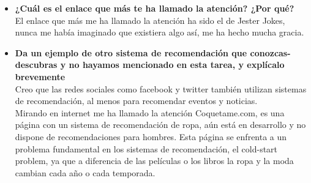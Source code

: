 \documentclass[es]{ifirak}
\begin{document}
\begin{itemize}
	\item \textbf{	¿Cuál es el enlace que más te ha llamado la atención? ¿Por qué?}\\
	El enlace que más me ha llamado la atención ha sido el de Jester Jokes, nunca me había imaginado que existiera algo así, me ha hecho mucha gracia.
	\item \textbf{ Da un ejemplo de otro sistema de recomendación que conozcas-descubras y no hayamos mencionado en esta tarea, y explícalo brevemente}\\
	Creo que las redes sociales como facebook y twitter también utilizan sistemas de recomendación, al menos para recomendar eventos y noticias.\\
	Mirando en internet me ha llamado la atención Coquetame.com, es una página con un sistema de recomendación de ropa, aún está en desarrollo y no dispone de recomendaciones para hombres. Esta página se enfrenta a un problema fundamental en los sistemas de recomendación, el cold-start problem, ya que a diferencia de las películas o los libros la ropa y la moda cambian cada año o cada temporada. 
	
\end{itemize}
\end{document}
